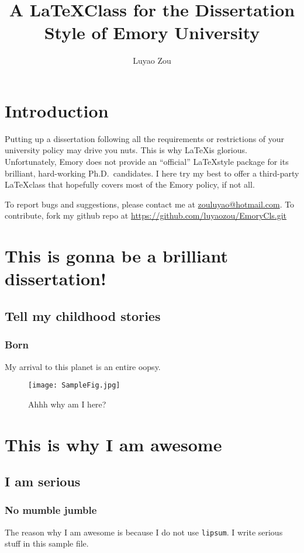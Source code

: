 \documentclass{emory}
\title{A \LaTeX Class for the Dissertation Style of Emory University}
\author{Luyao Zou}                      %
\begin{document}
\chapter{Introduction}
Putting up a dissertation following all the requirements or restrictions of
your university policy may drive you nuts. This is why \LaTeX is glorious. 
Unfortunately, Emory does not provide an ``official'' \LaTeX style package for
its brilliant, hard-working Ph.D.\ candidates. I here try my best to offer a
third-party \LaTeX class that hopefully covers most of the Emory policy, if not
all.

To report bugs and suggestions, please contact me at \url{zouluyao@hotmail.com}.
To contribute, fork my github repo at \url{https://github.com/luyaozou/EmoryCls.git}
  
\chapter{This is gonna be a brilliant dissertation!}
\section{Tell my childhood stories}
\subsection{Born}
My arrival to this planet is an entire oopsy. 

\begin{figure}
  \centering
  \texttt{[image: SampleFig.jpg]}
  \caption{Ahhh why am I here?}
\end{figure}


\chapter{This is why I am awesome}
\section{I am serious}
\subsection{No mumble jumble}
The reason why I am awesome is because I do not use \verb|lipsum|. I write 
serious stuff in this sample file.
\end{document}
